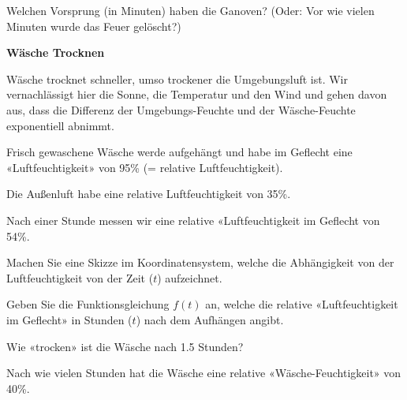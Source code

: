 Welchen Vorsprung (in Minuten) haben die Ganoven? (Oder: Vor wie vielen Minuten wurde das Feuer gelöscht?)


\platzFuerBerechnungenBisEndeSeite{}





\bbwActAufgabenNr{} \textbf{Wäsche Trocknen}

Wäsche trocknet schneller, umso trockener die Umgebungsluft ist. Wir
vernachlässigt hier die Sonne, die Temperatur und den Wind und gehen
davon aus, dass die Differenz der Umgebungs-Feuchte und der
Wäsche-Feuchte exponentiell abnimmt.

Frisch gewaschene Wäsche werde aufgehängt und habe im Geflecht eine «Luftfeuchtigkeit» von 95\%
(= relative Luftfeuchtigkeit).

Die Außenluft habe eine relative Luftfeuchtigkeit von 35\%. 


Nach einer
Stunde messen wir eine relative «Luftfeuchtigkeit im Geflecht von
54\%.


\begin{bbwAufgabenBlock}
\item Machen Sie eine Skizze im Koordinatensystem, welche die
Abhängigkeit von der Luftfeuchtigkeit von der Zeit ($t$) aufzeichnet.


\item Geben Sie die Funktionsgleichung $f(t)$ an, welche die relative
«Luftfeuchtigkeit im Geflecht» in Stunden ($t$) nach dem Aufhängen
angibt.


\item Wie «trocken» ist die Wäsche nach 1.5 Stunden?


\item Nach wie vielen Stunden hat die Wäsche eine relative
«Wäsche-Feuchtigkeit» von 40\%.

\TRAINER{

$$f(t) = 35 + 60 \cdot \left( \frac{19}{60}\right)^t$$
$f(t) = 40[\%]$ einsetzen:

$$40 [\%| = 35 + 60 \cdot \left( \frac{19}{60}\right)^t$$
$$5 [\%| = 60 \cdot \left( \frac{19}{60}\right)^t$$
$$\frac5{60} [\%| =\left( \frac{19}{60}\right)^t$$
$$t = \log_{\frac{19}{60}}(\frac5{60}) \approx 2.16 [\textrm{h}]$$
}%

\end{bbwAufgabenBlock}


\platzFuerBerechnungenBisEndeSeite{}



  

  
\newpage
